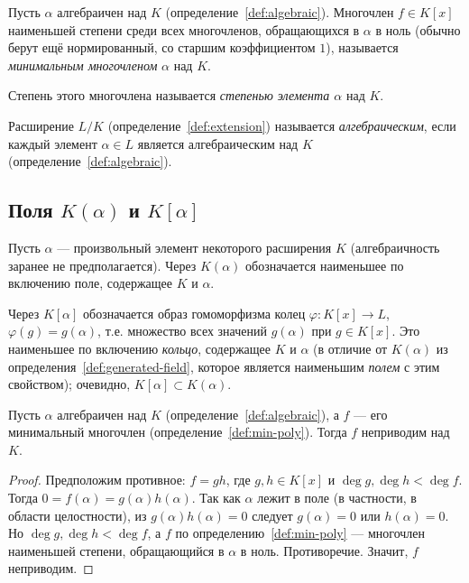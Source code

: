 \documentclass[12pt]{article}
\begin{document}
    \begin{definition}\label{def:min-poly}
    	Пусть $\alpha$ алгебраичен над $K$ (определение~\ref{def:algebraic}). Многочлен $f \in K[x]$ наименьшей степени среди всех многочленов, обращающихся в $\alpha$ в ноль (обычно берут ещё нормированный, со старшим коэффициентом $1$), называется \emph{минимальным многочленом} $\alpha$ над $K$.
    
    	Степень этого многочлена называется \emph{степенью элемента $\alpha$} над $K$.
    \end{definition}
    
    \begin{definition}\label{def:algebraic-extension}
    	Расширение $L/K$ (определение~\ref{def:extension}) называется \emph{алгебраическим}, если каждый элемент $\alpha \in L$ является алгебраическим над $K$ (определение~\ref{def:algebraic}).
    \end{definition}
    
    \subsection{Поля $K(\alpha)$ и $K[\alpha]$}
    
    \begin{definition}\label{def:generated-field}
    	Пусть $\alpha$ --- произвольный элемент некоторого расширения $K$ (алгебраичность заранее не предполагается). Через $K(\alpha)$ обозначается наименьшее по включению поле, содержащее $K$ и $\alpha$.
    \end{definition}
    
    \begin{definition}[кольцо $K{[}\alpha{]}$]\label{def:Kalpha-ring}
    	Через $K[\alpha]$ обозначается образ гомоморфизма колец $\varphi: K[x] \to L$, $\varphi(g) = g(\alpha)$, т.е. множество всех значений $g(\alpha)$ при $g \in K[x]$. Это наименьшее по включению \emph{кольцо}, содержащее $K$ и $\alpha$ (в отличие от $K(\alpha)$ из определения~\ref{def:generated-field}, которое является наименьшим \emph{полем} с этим свойством); очевидно, $K[\alpha] \subset K(\alpha)$.
    \end{definition}
    
    \begin{theorem}\label{thm:irreducible}
    	Пусть $\alpha$ алгебраичен над $K$ (определение~\ref{def:algebraic}), а $f$ --- его минимальный многочлен (определение~\ref{def:min-poly}). Тогда $f$ неприводим над $K$.
    \end{theorem}
    \begin{proof}
    	Предположим противное: $f = gh$, где $g, h \in K[x]$ и $\deg g, \deg h < \deg f$. Тогда $0 = f(\alpha) = g(\alpha)h(\alpha)$. Так как $\alpha$ лежит в поле (в частности, в области целостности), из $g(\alpha)h(\alpha)=0$ следует $g(\alpha)=0$ или $h(\alpha)=0$. Но $\deg g, \deg h < \deg f$, а $f$ по определению~\ref{def:min-poly} --- многочлен наименьшей степени, обращающийся в $\alpha$ в ноль. Противоречие. Значит, $f$ неприводим.
    \end{proof}
    
\end{document}
